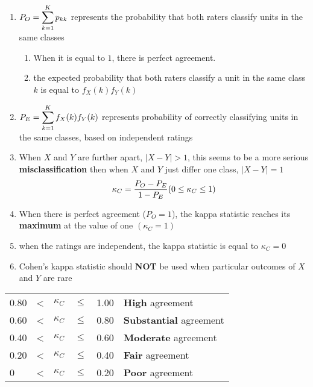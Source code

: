 \begin{enumerate}
    \item $P_O = \displaystyle\sum_{k=1}^K p_{kk}$ represents the probability that both raters classify units in the same classes
    \begin{enumerate}
        \item When it is equal to $1$, there is perfect agreement.

        \item the expected probability that both raters classify a unit in the same class $k$ is equal to $f_X(k)f_Y(k)$
    \end{enumerate}

    \item $P_E = \displaystyle\sum_{k=1}^K f_X(k)f_Y(k)$ represents probability of correctly classifying units in the same classes, based on independent ratings

    \item When $X$ and $Y$ are further apart, $|X - Y| > 1$, this seems to be a more serious \textbf{misclassification} then when $X$ and $Y$ just differ one class, $|X - Y| = 1$
    \[
        \hfill
        \kappa_C = \dfrac{P_O - P_E}{1 - P_E}
        \hfill
        (0 \leq \kappa_C \leq 1)
    \]

    \item When there is perfect agreement ($P_O = 1$), the kappa statistic reaches its \textbf{maximum} at the value of one $(\kappa_C = 1)$

    \item when the ratings are independent, the kappa statistic is equal to $\kappa_C = 0$

    \item Cohen’s kappa statistic should \textbf{NOT} be used when particular outcomes of $X$ and $Y$ are rare

\end{enumerate}

\begin{table}[H]
    \centering
    \begin{tabular}{l l l l l l}
    0.80 & < & $\kappa_C$ & $\leq$ & 1.00 &  \textbf{High} agreement\\
    0.60 & < & $\kappa_C$ & $\leq$ & 0.80  & \textbf{Substantial} agreement \\
    0.40 & < & $\kappa_C$ & $\leq$ & 0.60 &  \textbf{Moderate} agreement \\
    0.20 & < & $\kappa_C$ & $\leq$ & 0.40 &  \textbf{Fair} agreement \\
    0   & < & $\kappa_C$ & $\leq$ & 0.20 &  \textbf{Poor} agreement
    \end{tabular}
\end{table}


